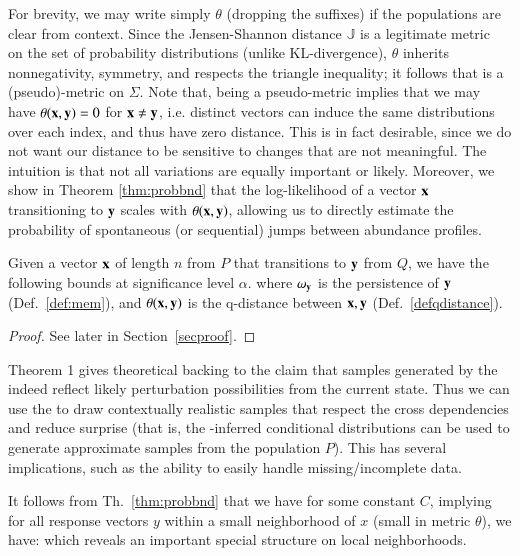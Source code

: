 \documentclass[onecolumn,10pt]{IEEEtran}
\begin{document}
For brevity, we may write simply $\theta$ (dropping the suffixes) if the populations are clear from context.  Since the Jensen-Shannon distance $\mathbb{J}$ is a legitimate metric~\cite{fuglede2004jensen} on the set of probability distributions (unlike KL-divergence), $\theta$ inherits nonnegativity, symmetry, and respects the triangle inequality; it follows that \qdist is a (pseudo)-metric on $\Sigma$. Note that, being a pseudo-metric implies that  we may have $\theta(\bm{\mathrm{x}}, \bm{\mathrm{y}}) = 0$ for $\bm{\mathrm{x}} \neq \bm{\mathrm{y}}$, i.e. distinct vectors can induce the same distributions over each index, and thus have zero distance. This is in fact desirable, since we do  not want  our distance to be sensitive to changes that are not meaningful.  The intuition is that not all variations are equally important or likely.    Moreover, we show in Theorem \ref{thm:probbnd} that the log-likelihood of a vector $\bm{\mathrm{x}}$ transitioning to $\bm{\mathrm{y}}$ scales with $\theta(\bm{\mathrm{x}},\bm{\mathrm{y}})$, allowing us to directly estimate the probability of spontaneous (or sequential) jumps between abundance profiles.

\begin{thm}\label{thm:probbnd}
  Given a vector $\bm{\mathrm{x}}$ of length $n$ from $P$ that transitions to $\bm{\mathrm{y}}$ from $Q$, we have the following bounds at significance level $\alpha$.
  where $\omega_{\bm{\mathrm{y}}}$ is the persistence of  $\bm{\mathrm{y}}$  (Def.~\ref{def:mem}), and $\theta(\bm{\mathrm{x}},\bm{\mathrm{y}})$ is the q-distance between $\bm{\mathrm{x}},\bm{\mathrm{y}}$ (Def.~\ref{defqdistance}).
\end{thm}

\begin{proof}
  See later in Section~\ref{secproof}.
\end{proof}

Theorem 1 gives theoretical backing to the claim that samples generated by the \qnet indeed reflect likely perturbation possibilities from the current state.  Thus we can use the \qnet to draw contextually realistic samples that respect the  cross dependencies and reduce surprise  (that is, the \qnet-inferred conditional distributions can be used to  generate approximate samples from the population $P$).  This has several implications, such as the ability to easily handle missing/incomplete data. 


\begin{rem}\label{rem:neighborhood}
  It follows from Th.~\ref{thm:probbnd} that we have for some constant $C$,
  implying for all response vectors $y$ within a small neighborhood of $x$ (small in metric $\theta$), we
  have:
  which reveals an important special structure on local neighborhoods.
\end{rem}
\end{document}
